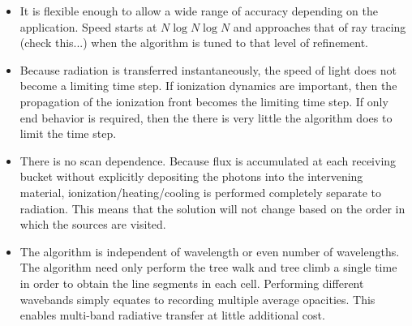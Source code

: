 \begin{itemize}
\item It is flexible enough to allow a wide range of accuracy depending on the application. Speed starts at  $N\log{N}\log{N}$ and approaches that of ray tracing (check this...) when the algorithm is tuned to that level of refinement.
\item Because radiation is transferred instantaneously, the speed of light does not become a limiting time step. If ionization dynamics are important, then the propagation of the ionization front becomes the limiting time step. If only end behavior is required, then the there is very little the algorithm does to limit the time step.
\item There is no scan dependence. Because flux is accumulated at each receiving bucket without explicitly depositing the photons into the intervening material, ionization/heating/cooling is performed completely separate to radiation. This means that the solution will not change based on the order in which the sources are visited.
\item The algorithm is independent of wavelength or even number of wavelengths. The algorithm need only perform the tree walk and tree climb a single time in order to obtain the line segments in each cell. Performing different wavebands simply equates to recording multiple average opacities. This enables multi-band radiative transfer at little additional cost.
\end{itemize}

